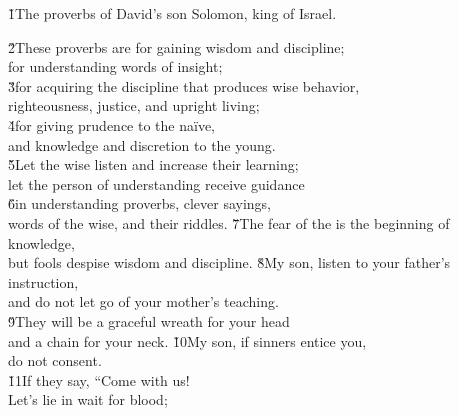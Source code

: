 


\v{1}The proverbs of David's son Solomon, king of Israel.

\begin{poetry}
\poeml \v{2}These proverbs are for gaining wisdom and discipline; \\
\poemll    for understanding words of insight; \\
\poeml \v{3}for acquiring the discipline that produces wise behavior, \\
\poemll    righteousness, justice, and upright living; \\
\poeml \v{4}for giving prudence to the na\"{i}ve, \\
\poemll    and knowledge and discretion to the young. \\
\poeml \v{5}Let the wise listen and increase their learning; \\
\poemll    let the person of understanding receive guidance \\
\poeml \v{6}in understanding proverbs, clever sayings, \\
\poemll    words of the wise, and their riddles.
\poeml \v{7}The fear of the  is the beginning of knowledge, \\
\poemll    but fools despise wisdom and discipline.
\poeml \v{8}My son, listen to your father's instruction, \\
\poemll    and do not let go of your mother's teaching. \\
\poeml \v{9}They will be a graceful wreath for your head \\
\poemll    and a chain for your neck.
\poeml \v{10}My son, if sinners entice you, \\
\poemll    do not consent. \\
\poeml \v{11}If they say, ``Come with us! \\
\poemll    Let's lie in wait for blood; \\

\end{poetry}
